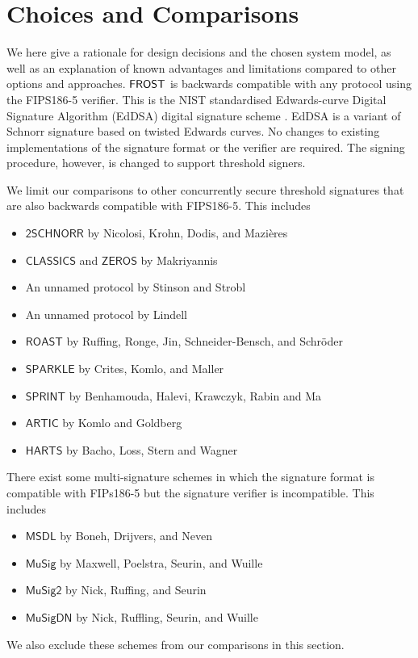 
\section{Choices and Comparisons}\label{section:comparisons}

We here give a rationale for design decisions and the chosen system model, as well as an explanation of known advantages and limitations compared to other options and approaches.
$\mathsf{FROST}$ is backwards compatible with any protocol using the FIPS186-5 verifier. 
This is the NIST standardised Edwards-curve Digital Signature Algorithm (EdDSA) digital signature scheme \cite{EdDSA}.
EdDSA is a variant of Schnorr signature based on twisted Edwards curves.
No changes to existing implementations of the signature format or the verifier are required.
The signing procedure, however, is changed to support threshold signers.

We limit our comparisons to other concurrently secure threshold signatures that are also backwards compatible with FIPS186-5.
This includes
\begin{itemize}
	\item $\mathsf{2SCHNORR}$ by Nicolosi, Krohn, Dodis, and Mazi\`eres \cite{NicolosiKDM03}
	\item $\mathsf{CLASSICS}$ and $\mathsf{ZEROS}$ by Makriyannis \cite{Makriyannis22}
	\item An unnamed protocol by Stinson and Strobl \cite{StinsonS01}
	\item An unnamed protocol by Lindell \cite{Lindell22}
	\item $\mathsf{ROAST}$ by Ruffing, Ronge, Jin, Schneider{-}Bensch, and Schr{\"{o}}der \cite{RuffingRJSS22}
	\item $\mathsf{SPARKLE}$ by Crites, Komlo, and Maller \cite{CritesKM23}
	\item $\mathsf{SPRINT}$ by Benhamouda, Halevi, Krawczyk, Rabin and Ma \cite{BenhamoudaHKRM23}
	\item $\mathsf{ARTIC}$ by Komlo and Goldberg \cite{KomloG24}
	\item $\mathsf{HARTS}$ by Bacho, Loss, Stern and Wagner \cite{BachoLSW24}
\end{itemize}

There exist some multi-signature schemes in which the signature format is compatible with FIPs186-5 but the signature verifier is incompatible.
This includes
\begin{itemize}
	\item $\mathsf{MSDL}$ by Boneh, Drijvers, and Neven  \cite{BonehDN18}
	\item $\mathsf{MuSig}$ by Maxwell, Poelstra, Seurin, and Wuille \cite{MaxwellPSW19}
	\item $\mathsf{MuSig2}$ by Nick, Ruffing, and Seurin \cite{NickRS21}
	\item $\mathsf{MuSigDN}$ by Nick, Ruffling, Seurin, and Wuille \cite{NickRSW20}
\end{itemize}
We also exclude these schemes from our comparisons in this section.

